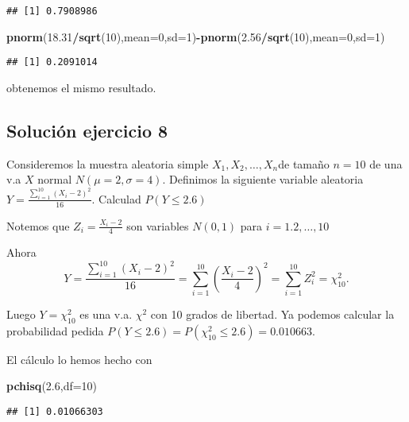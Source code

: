\documentclass[]{article}
\newenvironment{Shaded}{\begin{snugshade}}{\end{snugshade}}
\newcommand{\DataTypeTok}[1]{\textcolor[rgb]{0.13,0.29,0.53}{#1}}
\newcommand{\DecValTok}[1]{\textcolor[rgb]{0.00,0.00,0.81}{#1}}
\newcommand{\FloatTok}[1]{\textcolor[rgb]{0.00,0.00,0.81}{#1}}
\newcommand{\KeywordTok}[1]{\textcolor[rgb]{0.13,0.29,0.53}{\textbf{#1}}}
\newcommand{\NormalTok}[1]{#1}
\newcommand{\OperatorTok}[1]{\textcolor[rgb]{0.81,0.36,0.00}{\textbf{#1}}}
\begin{document}
\begin{verbatim}
## [1] 0.7908986
\end{verbatim}

\begin{Shaded}
\begin{Highlighting}[]
\KeywordTok{pnorm}\NormalTok{(}\FloatTok{18.31}\OperatorTok{/}\KeywordTok{sqrt}\NormalTok{(}\DecValTok{10}\NormalTok{),}\DataTypeTok{mean=}\DecValTok{0}\NormalTok{,}\DataTypeTok{sd=}\DecValTok{1}\NormalTok{)}\OperatorTok{-}\KeywordTok{pnorm}\NormalTok{(}\FloatTok{2.56}\OperatorTok{/}\KeywordTok{sqrt}\NormalTok{(}\DecValTok{10}\NormalTok{),}\DataTypeTok{mean=}\DecValTok{0}\NormalTok{,}\DataTypeTok{sd=}\DecValTok{1}\NormalTok{)}
\end{Highlighting}
\end{Shaded}

\begin{verbatim}
## [1] 0.2091014
\end{verbatim}

obtenemos el mismo resultado.

\hypertarget{soluciuxf3n-ejercicio-8}{%
\subsection{Solución ejercicio 8}\label{soluciuxf3n-ejercicio-8}}

Consideremos la muestra aleatoria simple \(X_1,X_2,\ldots,X_{n}\)de
tamaño \(n=10\) de una v.a \(X\) normal \(N(\mu=2,\sigma=4)\). Definimos
la siguiente variable aleatoria
\(Y=\frac{\sum\limits_{i=1}^{10}{(X_i-2)}^2}{16}\). Calculad
\(P(Y\leq 2.6)\)

Notemos que \(Z_i=\frac{X_i-2}{4}\) son variables \(N(0,1)\) para
\(i=1.2,\ldots,10\)

Ahora \[
Y=\frac{\sum\limits_{i=1}^{10}{(X_i-2)}^2}{16}=
\sum\limits_{i=1}^{10}\left(\frac{X_i-2}{4}\right)^2=
\sum\limits_{i=1}^{10} Z_i^2=\chi_{10}^2.
\]

Luego \(Y=\chi_{10}^2\) es una v.a. \(\chi^2\) con 10 grados de
libertad. Ya podemos calcular la probabilidad pedida
\(P(Y\leq 2.6)=P(\chi_{10}^2\leq 2.6)=0.010663.\)

El cálculo lo hemos hecho con

\begin{Shaded}
\begin{Highlighting}[]
\KeywordTok{pchisq}\NormalTok{(}\FloatTok{2.6}\NormalTok{,}\DataTypeTok{df=}\DecValTok{10}\NormalTok{)}
\end{Highlighting}
\end{Shaded}

\begin{verbatim}
## [1] 0.01066303
\end{verbatim}
\end{document}
